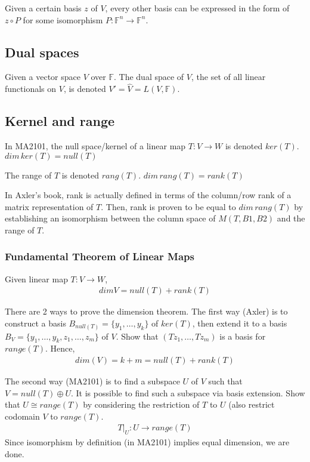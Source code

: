 \documentclass{article}
\begin{document}
Given a certain basis $z$ of $V$, every other basis can be expressed in the form of $z\circ P$ for some isomorphism $P:\mathbb{F}^n\rightarrow \mathbb{F}^n$.

\subsection{Dual spaces}
Given a vector space $V$ over $\mathbb{F}$. The dual space of $V$, the set of all linear functionals on $V$, is denoted $V'=\hat{V}=L(V, \mathbb{F})$.

\subsection{Kernel and range}
In MA2101, the null space/kernel of a linear map $T:V\rightarrow W$ is denoted $ker(T)$. $dim\, ker(T) = null(T)$

The range of $T$ is denoted $rang(T)$. $dim\, rang(T)=rank(T)$

In Axler's book, rank is actually defined in terms of the column/row rank of a matrix representation of $T$. Then, rank is proven to be equal to $dim\, rang(T)$ by establishing an isomorphism between the column space of $M(T,B1,B2)$ and the range of $T$.

\subsubsection{Fundamental Theorem of Linear Maps}
Given linear map $T:V\rightarrow W$,
\begin{align*}
	dim V = null(T) + rank(T)
\end{align*}

There are 2 ways to prove the dimension theorem.
The first way (Axler) is to construct a basis $B_{null(T)}=\{y_1,\dots, y_k\}$ of $ker(T)$, then extend it to a basis $B_V=\{y_1,\dots,y_k, z_1,\dots, z_m\}$ of $V$. Show that $(Tz_1,\dots, Tz_m)$ is a basis for $range(T)$. 
Hence,
\begin{align*}
	dim(V) = k + m = null(T) + rank(T)
\end{align*}

The second way (MA2101) is to find a subspace $U$ of $V$ such that $V=null(T)\oplus U$. It is possible to find such a subspace via basis extension. Show that $U\cong range(T)$ by considering the restriction of $T$ to $U$ (also restrict codomain $V$ to $range(T)$. 
\begin{align*}
	T|_U:U\rightarrow range(T)
\end{align*}
Since isomorphism by definition (in MA2101) implies equal dimension, we are done.
\end{document}
